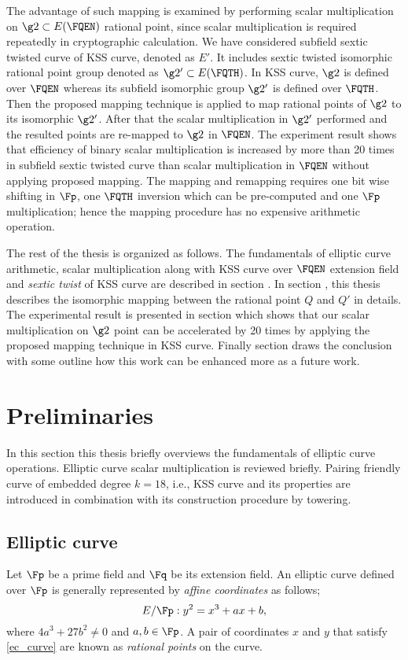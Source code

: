         The advantage of such mapping is examined by performing scalar multiplication on $\g2 \subset E(\FQEN)$ rational point, since scalar multiplication is required repeatedly in cryptographic calculation. 
        We have considered subfield sextic twisted curve of KSS curve, denoted as $E'$. It includes sextic twisted isomorphic rational point group denoted as $\g2' \subset E(\FQTH)$. In KSS curve, $\g2$ is defined over $\FQEN$ whereas its subfield isomorphic group $\g2'$ is defined over $\FQTH$. Then the proposed mapping technique is applied to map rational points of $\g2$ to its isomorphic $\g2'$. After that the scalar multiplication in $\g2'$ performed and the resulted points are re-mapped to $\g2$ in $\FQEN$.
        The experiment result shows  that efficiency of binary scalar multiplication is increased by more than 20 times in subfield sextic twisted curve than scalar multiplication in $\FQEN$ without applying proposed mapping. The mapping and remapping requires one bit wise shifting in $\Fp$, one $\FQTH$ inversion which can be pre-computed and one $\Fp$ multiplication; hence the mapping procedure has no expensive arithmetic operation.
        
        The rest of the thesis is organized as follows. 
        The fundamentals of elliptic curve arithmetic, scalar multiplication along with KSS curve over $\FQEN$ extension field and \textit{sextic twist} of KSS curve are described in section .
        In section , this thesis describes the isomorphic mapping between the rational point $Q$ and $Q'$ in details. The experimental result is presented in section  which shows that our scalar multiplication on $\g2$ point can be accelerated by 20 times by applying the proposed mapping technique in KSS curve. Finally section  draws the conclusion with some outline how this work can be enhanced more as a future work.
        
        \section{Preliminaries}
        In this section this thesis briefly overviews the fundamentals of elliptic curve operations. Elliptic curve scalar multiplication is reviewed briefly. Pairing friendly curve of embedded degree $k=18$, i.e., KSS curve and its properties are introduced in combination  with its construction procedure by towering.
        \subsection{Elliptic curve}
        Let $\Fp$ be a prime field and $\Fq$ be its extension field. An elliptic curve \cite{washington2003elliptic} defined over $\Fp$ is generally represented by \textit{affine coordinates} \cite{Silverman} as follows;
        \begin{equation}\label{ec_curve}
        E/\Fp : y^2=x^3+ax+b,
        \end{equation}
        where $ 4a^3+27b^2 \neq 0$ and $a,b \in \Fp$. A pair of coordinates $x$ and $y$ that satisfy \eqref{ec_curve} are known as \textit{rational points} on the curve. 
        
